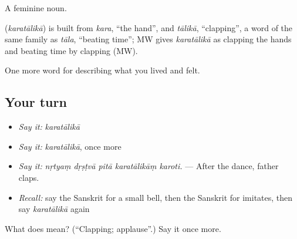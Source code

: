 A feminine noun.

\begin{cousinweb}
\textbf{} (\emph{karatālikā}) is built from \emph{kara}, \textquotedblleft{}the hand\textquotedblright{}, and \emph{tālikā}, \textquotedblleft{}clapping\textquotedblright{}, a word of the same family as \emph{tāla}, \textquotedblleft{}beating time\textquotedblright{}; MW gives \emph{karatālikā} as clapping the hands and beating time by clapping (MW).
\end{cousinweb}

\begin{grammarlens}[title={What you've built}]
One more word for describing what you lived and felt.
\end{grammarlens}

\subsection*{Your turn}
\begin{itemize}
\raggedright
  \item \emph{Say it:} \emph{karatālikā}
  \item \emph{Say it:} \emph{karatālikā}, once more
  \item \emph{Say it:} \emph{nṛtyaṃ dṛṣṭvā pitā karatālikāṃ karoti.} — After the dance, father claps.
  \item \emph{Recall:} say the Sanskrit for a small bell, then the Sanskrit for imitates, then say \emph{karatālikā} again
\end{itemize}

\begin{tcolorbox}[breakable,colback=teal!4,colframe=teal!35!black,title={Before you move on}]
What does  mean? (\textquotedblleft{}Clapping; applause\textquotedblright{}.) Say it once more.
\end{tcolorbox}
